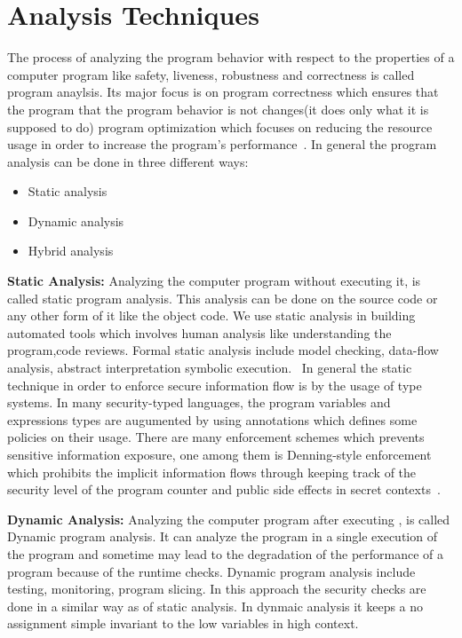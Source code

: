 \section{Analysis Techniques}

The process of analyzing the program behavior with respect to the properties of a computer program like safety, liveness,
robustness and correctness is called program anaylsis. 
Its major focus is on program correctness which ensures 
that the program that the program behavior is
not changes(it does only what it is supposed to do) program optimization which focuses
on reducing the resource usage in order to increase the program's performance~\cite{wiki:analysis}.
In general the program analysis can be done in three different ways:

\begin{itemize}
\item Static analysis
\item Dynamic analysis
\item Hybrid analysis
\end{itemize}

\textbf{Static Analysis:}
Analyzing the computer program without executing it,
is called static program analysis.
This analysis can be done on the source code or 
any other form of it like the object code.
We use static analysis in building automated tools
which involves human analysis like understanding the 
program,code reviews.
Formal static analysis include model checking, 
data-flow analysis, abstract interpretation
symbolic execution.~\cite{survey:automated}
In general the static technique in order to enforce secure information
flow is by the usage of type systems. In many security-typed languages,
the program variables and expressions types are augumented by using
annotations which defines some policies on their usage. There are many enforcement
schemes which prevents sensitive information exposure, one among them
is Denning-style enforcement which prohibits the implicit information
flows through keeping track of the security level of the program counter and
public side effects in secret contexts~\cite{book:analysis}.

\textbf{Dynamic Analysis:}
Analyzing the computer program after executing , is 
called Dynamic program analysis. It can analyze the program in a single
execution of the program and sometime may lead to the degradation of 
the performance of a program because of the runtime checks. Dynamic
program analysis include testing, monitoring, program slicing.
In this approach the security checks are done in a similar way as of static
analysis. In dynmaic analysis it keeps a no assignment simple invariant to 
the low variables in high context.

